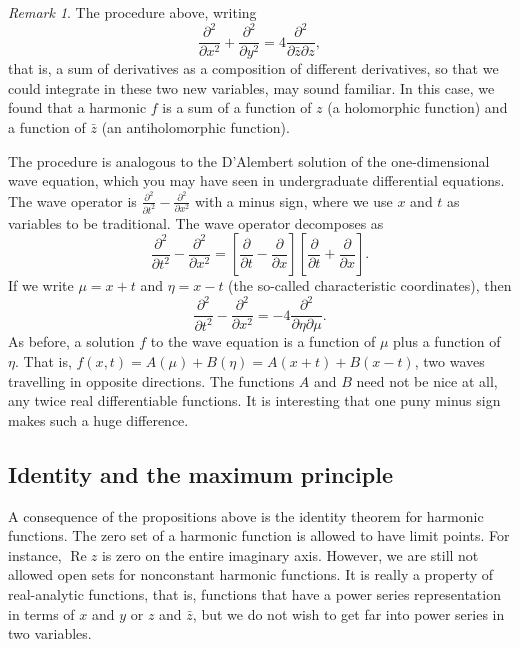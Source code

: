\documentclass[12pt,openany]{book}
\renewcommand{\Re}{\operatorname{Re}}
\theoremstyle{plain}
\theoremstyle{remark}
\newtheorem{remark}[thm]{Remark}
\theoremstyle{definition}
\theoremstyle{exercise}
\theoremstyle{example}
\begin{document}
\begin{remark}
The procedure above, writing
\begin{equation*}
\frac{\partial^2}{\partial x^2}+ \frac{\partial^2}{\partial y^2} = 
4 \frac{\partial^2}{\partial \bar{z} \partial z} ,
\end{equation*}
that is, a sum of derivatives as a composition of
different derivatives,
so that we could integrate in these two new variables, may
sound familiar.  In this case, we found that a harmonic $f$ is a sum of a function
of $z$ (a holomorphic function) and a function of $\bar{z}$ (an
antiholomorphic function).

The procedure is analogous to the D'Alembert solution of the one-dimensional
wave equation, which you may have seen in undergraduate differential equations.
The wave operator is
$\frac{\partial^2}{\partial t^2}- \frac{\partial^2}{\partial x^2}$ with a
minus sign, where we use $x$ and $t$ as variables to be traditional.
The wave operator decomposes as
\begin{equation*}
\frac{\partial^2}{\partial t^2}- \frac{\partial^2}{\partial x^2}
=
\left[ \frac{\partial}{\partial t}- \frac{\partial}{\partial x}
\right]
\left[ \frac{\partial}{\partial t}+ \frac{\partial}{\partial x}
\right] .
\end{equation*}
If we write $\mu = x+t$ and $\eta = x-t$
(the so-called characteristic coordinates), then
\begin{equation*}
\frac{\partial^2}{\partial t^2}- \frac{\partial^2}{\partial x^2}
= 
-4 \frac{\partial^2}{\partial \eta \partial \mu} .
\end{equation*}
As before, a solution $f$ to the wave equation is a function
of $\mu$ plus a function of $\eta$.  That is, $f(x,t) = A(\mu) + B(\eta) =
A(x+t)+B(x-t)$, two waves travelling in opposite directions.  The
functions $A$ and $B$ need not be nice at all, any twice real differentiable
functions.
It is interesting that one puny minus sign makes such a huge difference.
\end{remark}

\subsection{Identity and the maximum principle}

A consequence of the propositions above is the identity theorem
for harmonic functions.
The zero set of a harmonic function is allowed to have limit points.
For instance, $\Re z$ is zero on the entire imaginary
axis.  However, we are still not allowed open sets for nonconstant harmonic
functions.  It is really a property of real-analytic functions, that is,
functions that have a power series representation in terms of $x$ and $y$
or $z$ and $\bar{z}$, but we do not wish to get far into power series in two
variables.
\end{document}
